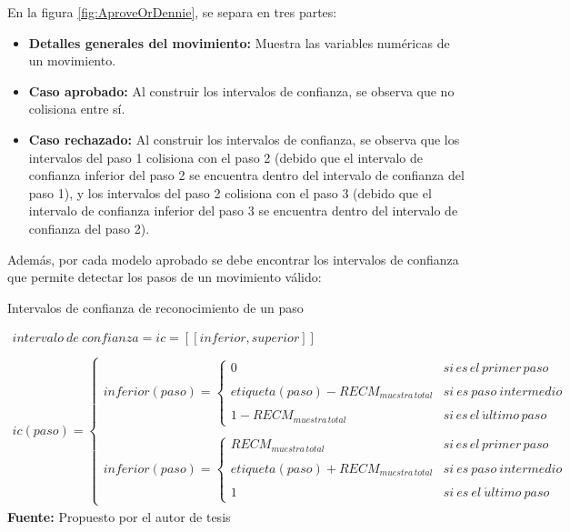 En la figura \ref{fig:AproveOrDennie}, se separa en tres partes:
\begin{itemize}
\item \textbf{Detalles generales del movimiento:} Muestra las variables num\'ericas de un movimiento.
\item \textbf{Caso aprobado:} Al construir los intervalos de confianza, se observa que no colisiona entre s\'i.
\item \textbf{Caso rechazado:} Al construir los intervalos de confianza, se observa que los intervalos del paso 1 colisiona con el paso 2 (debido que el intervalo de confianza inferior del paso 2 se encuentra dentro del intervalo de confianza del paso 1), y los intervalos del paso 2 colisiona con el paso 3 (debido que el intervalo de confianza inferior del paso 3 se encuentra dentro del intervalo de confianza del paso 2).
\end{itemize}
Adem\'as, por cada modelo aprobado se debe encontrar los intervalos de confianza  que permite detectar los pasos de un movimiento v\'alido:
\begin{formula}[H]
	\centering
	\caption{Intervalos de confianza de reconocimiento de un paso}
	\label{frm:rangoConfiabilidad}
	\begin{equation}
\begin{matrix}

intervalo\: de\: confianza = ic =[[inferior,superior]] \\
\\
ic(paso)=\left\{\begin{matrix}
inferior(paso)=\left\{\begin{matrix}
0 & si\, es\, el\, primer\, paso\\ \\ 
etiqueta(paso)- RECM_{muestra\, total} & si\: es\: paso\: intermedio \\ 
\\
1-RECM_{muestra\, total}& si\, es\, el\, \acute{u}ltimo\, paso
\end{matrix}\right. \\ 
\\ 
inferior(paso)=\left\{\begin{matrix}
RECM_{muestra\, total}& si\, es\, el\, primer\, paso \\
\\
etiqueta(paso)+RECM_{muestra\, total} & si\: es\: paso\: intermedio \\ \\ 
1 & si\: es\: el\: \acute{u}ltimo\: paso
\end{matrix}\right.
\end{matrix}\right.
\end{matrix}
	\end{equation}
	\textbf{Fuente:} Propuesto por el autor de tesis
\end{formula} 
